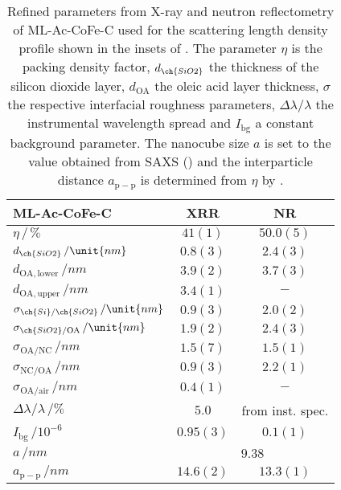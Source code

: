 \documentclass[\main/dresen_thesis.tex]{subfiles}
\begin{document}
  \begin{table}[!htbp]
    \centering
    \caption{\label{tab:monolayers:structure:ML-Ac-CoFe-C-WithSpacer}Refined parameters from X-ray and neutron reflectometry of ML-Ac-CoFe-C used for the scattering length density profile shown in the insets of . The parameter $\eta$ is the packing density factor, $d_{\ch{SiO2}}$ the thickness of the silicon dioxide layer, $d_{\mathrm{OA}}$ the oleic acid layer thickness, $\sigma$ the respective interfacial roughness parameters, $\Delta \lambda / \lambda$ the instrumental wavelength spread and $I_\mathrm{bg}$ a constant background parameter. The nanocube size $a$ is set to the value obtained from SAXS () and the interparticle distance $a_\mathrm{p-p}$ is determined from $\eta$ by .}
    \begin{tabular}{l | c | c}
      \hline
      ML-Ac-CoFe-C & \textbf{XRR} & \textbf{NR}\\
      \hline
      $\eta \, /\, \%$                               & $41(1)$    & $50.0(5)$  \\
      $d_{\ch{SiO2}} \, / \unit{nm}$                 & $0.8(3)$   & $2.4(3)$  \\
      $d_{\mathrm{OA, lower}} \, / \unit{nm}$        & $3.9(2)$   & $3.7(3)$  \\
      $d_{\mathrm{OA, upper}} \, / \unit{nm}$        & $3.4(1)$   & $-$  \\
      $\sigma_{\ch{Si}/\ch{SiO2}} \, / \unit{nm}$    & $0.9(3)$   & $2.0(2)$  \\
      $\sigma_{\ch{SiO2}/\mathrm{OA}}\, / \unit{nm}$ & $1.9(2)$   & $2.4(3)$  \\
      $\sigma_\mathrm{OA/NC} \, / \unit{nm}$         & $1.5(7)$   & $1.5(1)$  \\
      $\sigma_\mathrm{NC/OA} \, / \unit{nm}$         & $0.9(3)$   & $2.2(1)$  \\
      $\sigma_\mathrm{OA/air} \, / \unit{nm}$        & $0.4(1)$   & $-$  \\
      $\Delta \lambda / \lambda \, / \unit{\%}$      & $5.0 $     & from inst. spec.\\
      $I_\mathrm{bg}\,/\unit{10^{-6}}$               & $0.95(3)$  & $0.1(1)$\\
      \hline
      $a \, / \unit{nm}$                             & \multicolumn{2}{c}{$9.38$} \\
      \hline
      $a_\mathrm{p-p} \, / \unit{nm}$                & $14.6(2)$     & $13.3(1)$ \\
      \hline
    \end{tabular}
  \end{table}
\end{document}
